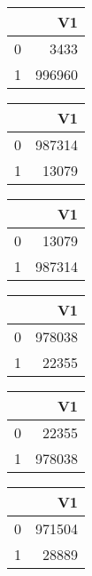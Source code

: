\bigskip\bigskip
\centering
\begin{tabular}{rr}
  \hline
 & V1 \\ 
  \hline
0 & 3433 \\ 
  1 & 996960 \\ 
   \hline
\end{tabular}

\bigskip\bigskip
\centering
\begin{tabular}{rr}
  \hline
 & V1 \\ 
  \hline
0 & 987314 \\ 
  1 & 13079 \\ 
   \hline
\end{tabular}

\bigskip\bigskip
\centering
\begin{tabular}{rr}
  \hline
 & V1 \\ 
  \hline
0 & 13079 \\ 
  1 & 987314 \\ 
   \hline
\end{tabular}

\bigskip\bigskip
\centering
\begin{tabular}{rr}
  \hline
 & V1 \\ 
  \hline
0 & 978038 \\ 
  1 & 22355 \\ 
   \hline
\end{tabular}

\bigskip\bigskip
\centering
\begin{tabular}{rr}
  \hline
 & V1 \\ 
  \hline
0 & 22355 \\ 
  1 & 978038 \\ 
   \hline
\end{tabular}

\bigskip\bigskip
\centering
\begin{tabular}{rr}
  \hline
 & V1 \\ 
  \hline
0 & 971504 \\ 
  1 & 28889 \\ 
   \hline
\end{tabular}

